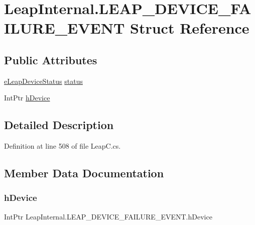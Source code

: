 \hypertarget{struct_leap_internal_1_1_l_e_a_p___d_e_v_i_c_e___f_a_i_l_u_r_e___e_v_e_n_t}{}\section{Leap\+Internal.\+L\+E\+A\+P\+\_\+\+D\+E\+V\+I\+C\+E\+\_\+\+F\+A\+I\+L\+U\+R\+E\+\_\+\+E\+V\+E\+NT Struct Reference}
\label{struct_leap_internal_1_1_l_e_a_p___d_e_v_i_c_e___f_a_i_l_u_r_e___e_v_e_n_t}
\subsection*{Public Attributes}
\begin{DoxyCompactItemize}
\item 
\mbox{\hyperlink{namespace_leap_internal_a16b28ea79f39b6205c514b3e9b075bed}{e\+Leap\+Device\+Status}} \mbox{\hyperlink{struct_leap_internal_1_1_l_e_a_p___d_e_v_i_c_e___f_a_i_l_u_r_e___e_v_e_n_t_a9c36f440dcd127726dc77ce90f04ace8}{status}}
\item 
Int\+Ptr \mbox{\hyperlink{struct_leap_internal_1_1_l_e_a_p___d_e_v_i_c_e___f_a_i_l_u_r_e___e_v_e_n_t_a3766ee7499650df3cadffb4c1b793cc2}{h\+Device}}
\end{DoxyCompactItemize}


\subsection{Detailed Description}


Definition at line 508 of file Leap\+C.\+cs.



\subsection{Member Data Documentation}
\mbox{\label{struct_leap_internal_1_1_l_e_a_p___d_e_v_i_c_e___f_a_i_l_u_r_e___e_v_e_n_t_a3766ee7499650df3cadffb4c1b793cc2}} 
\subsubsection{\texorpdfstring{hDevice}{hDevice}}
{\footnotesize\ttfamily Int\+Ptr Leap\+Internal.\+L\+E\+A\+P\+\_\+\+D\+E\+V\+I\+C\+E\+\_\+\+F\+A\+I\+L\+U\+R\+E\+\_\+\+E\+V\+E\+N\+T.\+h\+Device}



